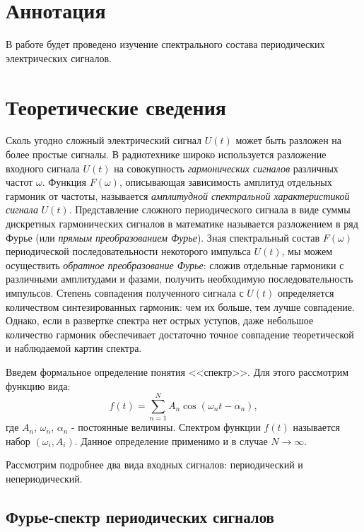 


\section{Аннотация}
В работе будет проведено изучение
спектрального состава периодических
электрических сигналов.

\section{Теоретические сведения}
Сколь угодно сложный электрический
сигнал $ U(t) $ может быть разложен на
более простые сигналы. В радиотехнике
широко используется разложение входного
сигнала $ U(t) $ на совокупность
\textit{гармонических сигналов}
различных частот $\omega$. Функция
$F(\omega)$, описывающая зависимость
амплитуд отдельных гармоник от частоты,
называется \textit{амплитудной
спектральной характеристикой сигнала} $
U(t) $. Представление сложного
периодического сигнала в виде суммы
дискретных гармонических сигналов в
математике называется разложением в ряд
Фурье (или \textit{прямым
преобразованием Фурье}). Зная
спектральный состав  $F(\omega)$
периодической последовательности
некоторого импульса $ U(t) $, мы можем
осуществить \textit{ обратное
преобразование Фурье}: сложив отдельные
гармоники с различными амплитудами и
фазами, получить необходимую
последовательность импульсов. Степень
совпадения полученного сигнала с $ U(t)
$ определяется количеством
синтезированных гармоник: чем их больше,
тем лучше совпадение. Однако, если в
развертке спектра нет острых уступов,
даже небольшое количество гармоник
обеспечивает достаточно точное
совпадение теоретической и наблюдаемой
картин спектра.


Введем формальное определение понятия
<<спектр>>. Для этого рассмотрим функцию вида:
\begin{equation}
f(t)=\sum_{n=1}^{N} A_{n} \cos \left(\omega_{n} t-\alpha_{n}\right),
\end{equation}
где $A_{n}$, $\omega_{n}$, $\alpha_{n}$ - постоянные величины. Спектром функции $f(t)$ называется набор
$(\omega_{i}, A_{i})$. Данное определение применимо и в случае $N \rightarrow \infty$.

Рассмотрим подробнее два вида входных сигналов: периодический и непериодический.

\subsection*{Фурье-спектр периодических сигналов}

